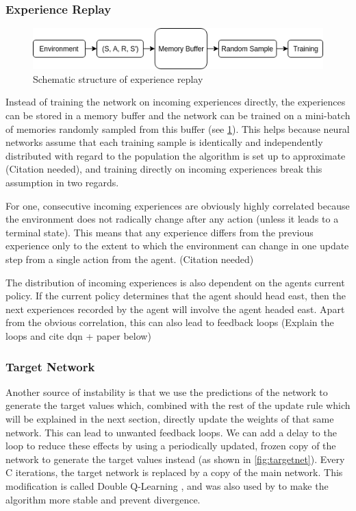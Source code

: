 \subsubsection{Experience Replay}\label{sec:exp_replay}

\begin{figure}[h]
    \centering
    \includegraphics[width=1\linewidth]{img/Experience_Replay.png}
    \caption{Schematic structure of experience replay}
    \label{fig:expreplay}
\end{figure}

Instead of training the network on incoming experiences directly, the experiences can be stored in a memory buffer and the network can be trained on a mini-batch of memories randomly sampled from this buffer (see \ref{fig:expreplay}). This helps because neural networks assume that each training sample is identically and independently distributed with regard to the population the algorithm is set up to approximate (Citation needed), and training directly on incoming experiences break this assumption in two regards.

For one, consecutive incoming experiences are obviously highly correlated because the environment does not radically change after any action (unless it leads to a terminal state). This means that any experience differs from the previous experience only to the extent to which the environment can change in one update step from a single action from the agent. (Citation needed)

The distribution of incoming experiences is also dependent on the agents current policy. If the current policy determines that the agent should head east, then the next experiences recorded by the agent will involve the agent headed east. Apart from the obvious correlation, this can also lead to feedback loops (Explain the loops and cite dqn + paper below)


\subsubsection{Target Network}\label{sec:target_network}
Another source of instability is that we use the predictions of the network to generate the target values which, combined with the rest of the update rule which will be explained in the next section, directly update the weights of that same network. This can lead to unwanted feedback loops. We can add a delay to the loop to reduce these effects by using a periodically updated, frozen copy of the network to generate the target values instead (as shown in \ref{fig:targetnet}). Every C iterations, the target network is replaced by a copy of the main network. This modification is called Double Q-Learning \citep{NIPS2010_3964}, and was also used by \citep{mnih2015human} to make the algorithm more stable and prevent divergence.

